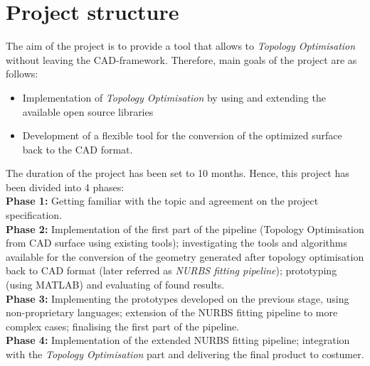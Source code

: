\section{Project structure}
The aim of the project is to provide a tool that allows to \textit{Topology Optimisation} without leaving the CAD-framework. Therefore, main goals of the project are as follows:
\begin{itemize}
\item Implementation of \textit{Topology Optimisation} by using and extending the available open source libraries
\item Development of a flexible tool for the conversion of the optimized surface back to the CAD format.
\end{itemize}

The duration of the project has been set to 10 months. Hence, this project has been divided into 4 phases:\\

\textbf{Phase 1:} Getting familiar with the topic and agreement on the project specification.\\

\textbf{Phase 2:} Implementation of the first part of the pipeline (Topology Optimisation from CAD surface using existing tools); investigating the tools and algorithms available for the conversion of the geometry generated after topology optimisation back to CAD format (later referred as \emph{NURBS fitting pipeline}); prototyping (using MATLAB) and evaluating of found results.\\

\textbf{Phase 3:} Implementing the prototypes developed on the previous stage, using non-proprietary languages; extension of the NURBS fitting pipeline to more complex cases; finalising the first part of the pipeline.\\

\textbf{Phase 4:} Implementation of the extended NURBS fitting pipeline; integration with the \emph{Topology Optimisation} part and delivering the final product to costumer.

